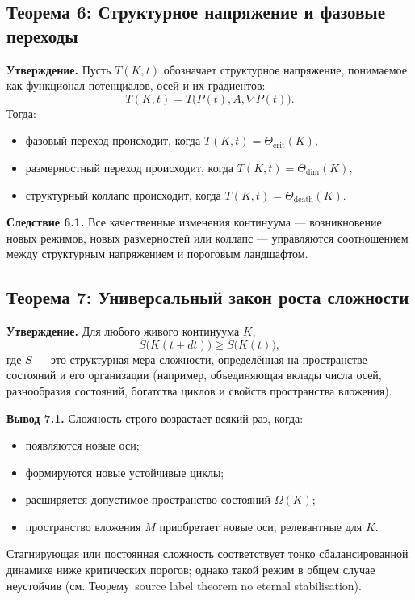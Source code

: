 \subsection{Теорема 6: Структурное напряжение и фазовые переходы}

\textbf{Утверждение.}
Пусть \(T(K,t)\) обозначает структурное напряжение, понимаемое как функционал потенциалов, осей и их градиентов:
\[
    T(K,t) = T\big(P(t),A,\nabla P(t)\big).
\]
Тогда:
\begin{itemize}
    \item фазовый переход происходит, когда
          \(
              T(K,t) = \Theta_{\mathrm{crit}}(K),
          \)
    \item размерностный переход происходит, когда
          \(
              T(K,t) = \Theta_{\mathrm{dim}}(K),
          \)
    \item структурный коллапс происходит, когда
          \(
              T(K,t) = \Theta_{\mathrm{death}}(K).
          \)
\end{itemize}

\textbf{Следствие 6.1.}
Все качественные изменения континуума --- возникновение новых режимов, новых размерностей или коллапс --- управляются соотношением между структурным напряжением и пороговым ландшафтом.

\subsection{Теорема 7: Универсальный закон роста сложности}

\textbf{Утверждение.}
Для любого живого континуума \(K\),
\[
    S\big(K(t+dt)\big) \ge S\big(K(t)\big),
\]
где \(S\) --- это структурная мера сложности, определённая на пространстве состояний и его организации (например, объединяющая вклады числа осей, разнообразия состояний, богатства циклов и свойств пространства вложения).

\textbf{Вывод 7.1.}
Сложность строго возрастает всякий раз, когда:
\begin{itemize}
    \item появляются новые оси;
    \item формируются новые устойчивые циклы;
    \item расширяется допустимое пространство состояний \(\Omega(K)\);
    \item пространство вложения \(M\) приобретает новые оси, релевантные для \(K\).
\end{itemize}
Стагнирующая или постоянная сложность соответствует тонко сбалансированной динамике ниже критических порогов; однако такой режим в общем случае неустойчив (см. Теорему~source label theorem no eternal stabilisation).

